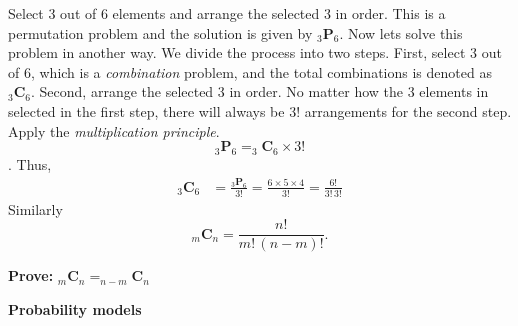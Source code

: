 \documentclass[a4paper, 12pt,twoside]{book}
\begin{document}
\begin{enumerate}
    Select 3 out of 6 elements and arrange the selected 3 in order. This is a permutation problem and the solution is given by $_3\textbf{P}_6$. Now lets solve this problem in another way. We divide the process into two steps. First, select 3 out of 6, which is a \textit{combination} problem, and the total combinations is denoted as $_3\textbf{C}_6$. Second, arrange the selected 3 in order. No matter how the 3 elements in selected in the first step, there will always be $3!$ arrangements for the second step. Apply the \textit{multiplication principle}.
    $$_3\textbf{P}_6 = _3\textbf{C}_6 \times 3!$$.
 Thus,
 \begin{equation*}
 \begin{split}
 _3\textbf{C}_6 &= \frac{_3\textbf{P}_6 }{3!} = \frac{6\times 5 \times 4}{3!} = \frac{6!}{3!\,3!}
 \end{split}
 \end{equation*}
 Similarly $$_m\textbf{C}_n = \frac{n!}{m!\,(n-m)!}.$$
    \vspace{0.3cm} 
    
    \colorbox{champagne}{\parbox{\textwidth}{
    \textbf{Prove:}  $_m\textbf{C}_n = _{n-m}\textbf{C}_n$
    }}  
    \end{enumerate}
    \newpage

\noindent   
\textbf{Probability models}    
\vspace{0.3cm}
\end{document}
